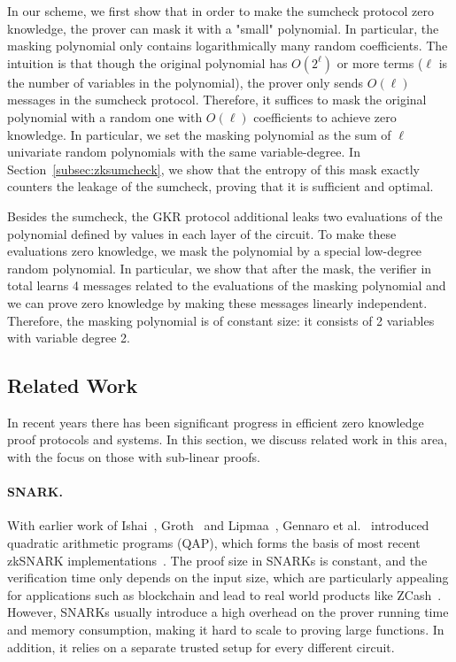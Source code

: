 In our scheme, we first show that in order to make the sumcheck protocol zero knowledge, the prover can mask it with a "small" polynomial. In particular, the masking polynomial only contains logarithmically many random coefficients. The intuition is that though the original polynomial has $O(2^\ell)$ or more terms ($\ell$ is the number of variables in the polynomial), the prover only sends $O(\ell)$ messages in the sumcheck protocol. Therefore, it suffices to mask the original polynomial with a random one with $O(\ell)$ coefficients to achieve zero knowledge. In particular, we set the masking polynomial as the sum of $\ell$ univariate random polynomials with the same variable-degree. In Section~\ref{subsec:zksumcheck}, we show that the entropy of this mask exactly counters the leakage of the sumcheck, proving that it is sufficient and optimal.

Besides the sumcheck, the GKR protocol additional leaks two evaluations of the polynomial defined by values in each layer of the circuit. To make these evaluations zero knowledge, we mask the polynomial by a special low-degree random polynomial. In particular, we show that after the mask, the verifier in total learns 4 messages related to the evaluations of the masking polynomial and we can prove zero knowledge by making these messages linearly independent. Therefore, the masking polynomial is of constant size: it consists of 2 variables with variable degree 2.


\subsection{Related Work}\label{subsec::related}

 In recent years there has been significant progress in efficient zero knowledge proof protocols and systems. In this section, we discuss related work in this area, with the focus on those with sub-linear proofs. 

\paragraph{SNARK.} With earlier work of Ishai~\cite{IshaiKO07}, Groth~\cite{Groth10} and Lipmaa~\cite{lipmaa2012progression}, Gennaro et al.~\cite{GGPR13} introduced quadratic arithmetic programs (QAP), which forms the basis of most recent zkSNARK implementations~\cite{parno2013pinocchio,ben2013snarks,braun13,libsnark,ben2014scalable,geppetto,DBLP:conf/eurocrypt/ChiesaTV15,wahby2015efficient,Fiore16,wu2018dizk}. The proof size in SNARKs is constant, and the verification time only depends on the input size, which are particularly appealing for applications such as blockchain and lead to real world products like ZCash~\cite{zerocash}. However, SNARKs usually introduce a high overhead on the prover running time and memory consumption, making it hard to scale to proving large functions. In addition, it relies on a separate trusted setup for every different circuit. 

